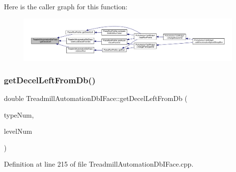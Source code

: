 Here is the caller graph for this function\+:
\nopagebreak
\begin{figure}[H]
\begin{center}
\leavevmode
\includegraphics[width=350pt]{class_treadmill_automation_db_i_face_a8cd4911ddb9fadc6a5b9c5ad4512851e_icgraph}
\end{center}
\end{figure}
\mbox{\label{class_treadmill_automation_db_i_face_a14c9cb53a3b95f0142bfbdb68fdfa02e}} 
\subsubsection{\texorpdfstring{get\+Decel\+Left\+From\+Db()}{getDecelLeftFromDb()}}
{\footnotesize\ttfamily double Treadmill\+Automation\+Db\+I\+Face\+::get\+Decel\+Left\+From\+Db (\begin{DoxyParamCaption}\item[{Q\+String}]{type\+Num,  }\item[{Q\+String}]{level\+Num }\end{DoxyParamCaption})}



Definition at line 215 of file Treadmill\+Automation\+Db\+I\+Face.\+cpp.

